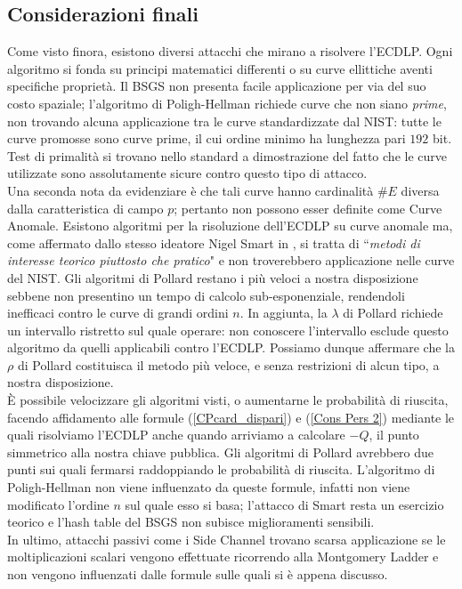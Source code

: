 \documentclass[a4paper,12pt]{tesiinfo}
\begin{document}
\subsection{Considerazioni finali}
\label{ecdlp conclusioni}
Come visto finora, esistono diversi attacchi che mirano a risolvere l'ECDLP. Ogni algoritmo si fonda su principi matematici differenti o su curve ellittiche aventi specifiche propriet\`a. Il BSGS non presenta facile applicazione per via del suo costo spaziale; l'algoritmo di Poligh-Hellman richiede curve che non siano \textit{prime}, non trovando alcuna applicazione tra le curve standardizzate dal NIST: tutte le curve promosse sono curve prime, il cui ordine minimo ha lunghezza pari $192$ bit. Test di primalit\`a si trovano nello standard \cite{dss} a dimostrazione del fatto che le curve utilizzate sono assolutamente sicure contro questo tipo di attacco. 
\\
Una seconda nota da evidenziare \`e che tali curve hanno cardinalit\`a $\#E$ diversa dalla caratteristica di campo $p$; pertanto non possono esser definite come Curve Anomale. Esistono algoritmi per la risoluzione dell'ECDLP su curve anomale ma, come affermato dallo stesso ideatore Nigel Smart in \cite{ev_curv2}, si tratta di ``\emph{metodi di interesse teorico piuttosto che pratico}" e non troverebbero applicazione nelle curve del NIST. Gli algoritmi di Pollard restano i pi\`u veloci a nostra disposizione sebbene non presentino un tempo di calcolo sub-esponenziale, rendendoli inefficaci contro le curve di grandi ordini $n$. In aggiunta, la $\lambda$ di Pollard richiede un intervallo ristretto sul quale operare: non conoscere l'intervallo esclude questo algoritmo da quelli applicabili contro l'ECDLP. Possiamo dunque affermare che la $\rho$ di Pollard costituisca il metodo pi\`u veloce, e senza restrizioni di alcun tipo, a nostra disposizione.
\\
\`E possibile velocizzare gli algoritmi visti, o aumentarne le probabilit\`a di riuscita, facendo affidamento alle formule (\ref{CPcard_dispari}) e (\ref{Cons Pers 2}) mediante le quali risolviamo l'ECDLP anche quando arriviamo a calcolare $-Q$, il punto simmetrico alla nostra chiave pubblica. Gli algoritmi di Pollard avrebbero due punti sui quali fermarsi raddoppiando le probabilit\`a di riuscita. L'algoritmo di Poligh-Hellman non viene influenzato da queste formule, infatti non viene modificato l'ordine $n$ sul quale esso si basa; l'attacco di Smart resta un esercizio teorico e l'hash table del BSGS non subisce miglioramenti sensibili.
\\
In ultimo, attacchi passivi come i Side Channel trovano scarsa applicazione se le moltiplicazioni scalari vengono effettuate ricorrendo alla Montgomery Ladder e non vengono influenzati dalle formule sulle quali si \`e appena discusso.
%
%
%
%
%
%
%
%
\end{document}
